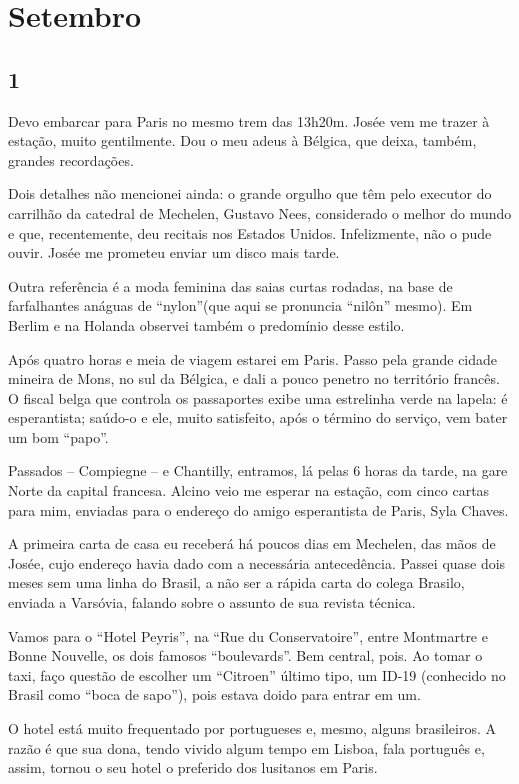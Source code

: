 \chapter{Setembro}
\section*{1 \adfflatleafright {}}

Devo embarcar para Paris no mesmo trem das 13h20m. Josée vem me trazer à estação, muito gentilmente. Dou o meu adeus à Bélgica, que deixa, também, grandes recordações.

Dois detalhes não mencionei ainda: o grande orgulho que têm pelo executor do carrilhão da catedral de Mechelen, Gustavo Nees, considerado o melhor do mundo e que, recentemente, deu recitais nos Estados Unidos. Infelizmente, não o pude ouvir. Josée me prometeu enviar um disco mais tarde.

Outra referência é a moda feminina das saias curtas rodadas, na base de farfalhantes anáguas de “nylon”(que aqui se pronuncia “nilôn” mesmo). Em Berlim e na Holanda observei também o predomínio desse estilo.

Após quatro horas e meia de viagem estarei em Paris. Passo pela grande cidade mineira de Mons, no sul da Bélgica, e dali a pouco penetro no território francês. O fiscal belga que controla os passaportes exibe uma estrelinha verde na lapela: é esperantista; saúdo-o e ele, muito satisfeito, após o término do serviço, vem bater um bom “papo”.

Passados -- Compiegne -- e Chantilly, entramos, lá pelas 6 horas da tarde, na gare Norte da capital francesa. Alcino veio me esperar na estação, com cinco cartas para mim, enviadas para o endereço do amigo esperantista de Paris, Syla Chaves.

A primeira carta de casa eu receberá há poucos dias em Mechelen, das mãos de Josée, cujo endereço havia dado com a necessária antecedência. Passei quase dois meses sem uma linha do Brasil, a não ser a rápida carta do colega Brasilo, enviada a Varsóvia, falando sobre o assunto de sua revista técnica.

Vamos para o “Hotel Peyris”, na “Rue du Conservatoire”, entre Montmartre e Bonne Nouvelle, os dois famosos “boulevards”. Bem central, pois. Ao tomar o taxi, faço questão de escolher um “Citroen” último tipo, um ID-19 (conhecido no Brasil como “boca de sapo”), pois estava doido para entrar em um.

O hotel está muito frequentado por portugueses e, mesmo, alguns brasileiros. A razão é que sua dona, tendo vivido algum tempo em Lisboa, fala português e, assim, tornou o seu hotel o preferido dos lusitanos em Paris.

